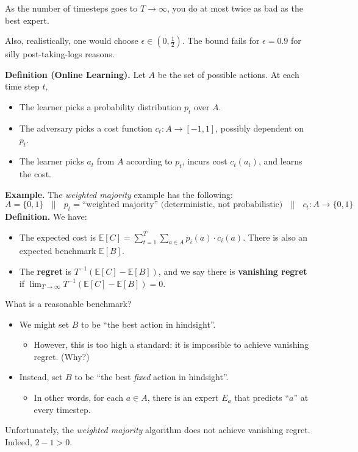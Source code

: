 \begin{remark}
    As the number of timesteps goes to $T \to \infty$, you do at most twice as bad as the best expert.

    Also, realistically, one would choose $\epsilon \in (0, \frac{1}{2})$.  The bound fails for $\epsilon = 0.9$ for silly post-taking-logs reasons.
\end{remark}

\textbf{Definition (Online Learning).} Let $A$ be the set of possible actions.  At each time step $t$,
\begin{itemize}
    \item The learner picks a probability distribution $p_t$ over $A$.
    \item The adversary picks a cost function $c_t: A \to [-1, 1]$, possibly dependent on $p_t$.
    \item The learner picks $a_t$ from $A$ according to $p_t$, incurs cost $c_t(a_t)$, and learns the cost.
\end{itemize}

\textbf{Example.} The \emph{weighted majority} example has the following:
\[ A = \{0, 1\} ~~~ \parallel ~~~ p_t = \text{``weighted majority'' (deterministic, not probabilistic)} ~~~ \parallel ~~~ c_t : A \to \{0, 1\} \]
\textbf{Definition.} We have:
\begin{itemize}
    \item The expected cost is $\mathbb{E}[C] = \sum_{t = 1}^T \sum_{a \in A} p_i(a) \cdot c_i(a)$.  There is also an expected benchmark $\mathbb{E}[B]$.
    \item The \textbf{regret} is $T^{-1} (\mathbb{E}[C] - \mathbb{E}[B])$, and we say there is \textbf{vanishing regret} if $\displaystyle\lim_{T \to \infty} T^{-1} (\mathbb{E}[C] - \mathbb{E}[B]) = 0$.
\end{itemize}

What is a reasonable benchmark?
\begin{itemize}
    \item We might set $B$ to be ``the best action in hindsight''.
    \begin{itemize}
        \item However, this is too high a standard: it is impossible to achieve vanishing regret.  (Why?)
    \end{itemize}
    \item Instead, set $B$ to be ``the best \emph{fixed} action in hindsight''.
    \begin{itemize}
        \item In other words, for each $a \in A$, there is an expert $E_a$ that predicts ``$a$'' at every timestep.
    \end{itemize}
\end{itemize}
Unfortunately, the \emph{weighted majority} algorithm does not achieve vanishing regret.  Indeed, $2 - 1 > 0$.

